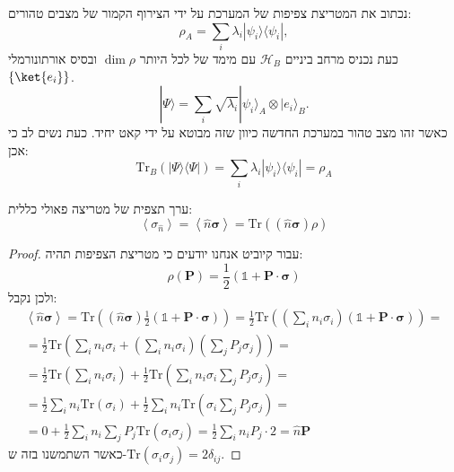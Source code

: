 \documentclass{tstextbook}
\begin{document}
\begin{proposition}
נכתוב את המטריצת צפיפות של המערכת על ידי הצירוף הקמור של מצבים טהורים:
$$\rho_{A}=\sum_{i}\lambda_{i}|\psi_{i}\rangle\langle\psi_{i}|,$$
כעת נכניס מרחב ביניים \(\mathcal{H}_{B}\) עם מימד של לכל היותר \(\dim \rho\) ובסיס אורתונורמלי \(\left\{  \ket{e_{i}}  \right\}\).
$$|\Psi\rangle=\sum_{i}\sqrt{\lambda_{i}}|\psi_{i}\rangle_{A}\otimes|e_{i}\rangle_{B}.$$
כאשר זהו מצב טהור במערכת החדשה כיוון שזה מבוטא על ידי קאט יחיד. כעת נשים לב כי אכן:
$$\mathrm{Tr}_{B}(|\Psi\rangle\langle\Psi|)=\sum_{i}\lambda_{i}|\psi_{i}\rangle\langle\psi_{i}|=\rho_{A}$$

\end{proposition}
\begin{proposition}
ערך תצפית של מטריצה פאולי כללית:
$$\left\langle  \sigma_{\hat{n}}  \right\rangle =\left\langle  \hat{n}\boldsymbol{\sigma}  \right\rangle =\mathrm{Tr}\left( \left( \hat{n}\boldsymbol{\sigma} \right)\rho \right)$$

\end{proposition}
\begin{proof}
עבור קיוביט אנחנו יודעים כי מטריצת הצפיפות תהיה:
$$\rho\left(\mathbf{P}\right)={\frac{1}{2}}\left(\mathbb{1}+\mathbf{P}\cdot\boldsymbol\sigma\right)$$
ולכן נקבל:
$$\begin{gather}\left\langle  \hat{n}\boldsymbol{\sigma}  \right\rangle =\mathrm{Tr}\left( \left( \hat{n}\boldsymbol{\sigma} \right){\frac{1}{2}}\left(\mathbb{1}+\mathbf{P}\cdot\boldsymbol\sigma\right) \right)=\frac{1}{2}\mathrm{Tr}\left( \left( \sum_{i}n_{i}\sigma_{i} \right) \left( \mathbb{1} +\mathbf{P}\cdot \boldsymbol{\sigma} \right) \right)=\\=\frac{1}{2}\mathrm{Tr}\left( \sum_{i}n_{i}\sigma_{i} + \left( \sum_{i}n_{i}\sigma_{i} \right)\left( \sum_{j}P_{j}\sigma_{j} \right)\right)=\\=\frac{1}{2}\mathrm{Tr}\left( \sum_{i}n_{i}\sigma_{i} \right)+\frac{1}{2}\mathrm{Tr}\left( \sum_{i}n_{i}\sigma_{i}\sum_{j}P_{j}\sigma_{j} \right)=\\=\frac{1}{2}\sum_{i}n_{i}\mathrm{Tr}\left( \sigma_{i} \right)+\frac{1}{2}\sum_{i}n_{i}\mathrm{Tr}\left( \sigma_{i}\sum_{j}P_{j}\sigma_{j} \right)=\\=0+\frac{1}{2}\sum_{i}n_{i}\sum_{j}P_{j}\mathrm{Tr}\left( \sigma_{i}\sigma_{j} \right)=\frac{1}{2}\sum_{i}n_{i}P_{j}\cdot 2=\hat{n} \mathbf{P} 
\end{gather}$$
כאשר השתמשנו בזה ש-\(\mathrm{Tr}\left( \sigma_{i}\sigma_{j} \right)=2\delta_{ij}\).

\end{proof}
\end{document}
